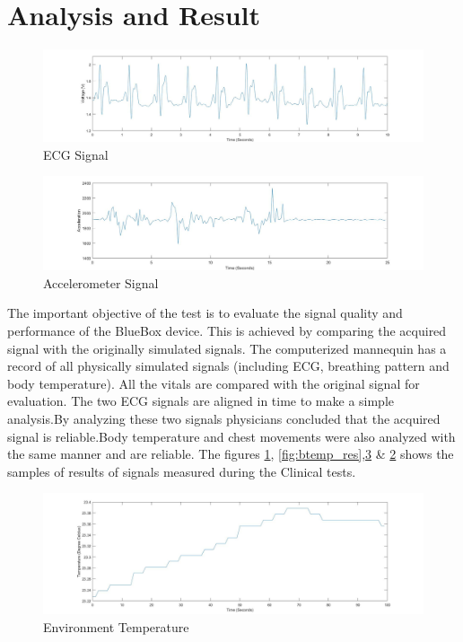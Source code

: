 \section{Analysis and Result}
\begin{figure}
	\centering
	\includegraphics[scale = 0.25 ]{ECG_result.jpg}
	\caption{ECG Signal\label{fig:ecg_res}}
\end{figure}
\begin{figure}[h]
	\centering
	\includegraphics[scale = 0.25 ]{acc_result.jpg}
	\caption{Accelerometer Signal\label{fig:acc_res}}
\end{figure}


The important objective of the test is to evaluate the signal quality and performance of the BlueBox device. This is achieved by comparing the acquired signal with the originally simulated signals. The computerized mannequin has a record of all physically simulated signals (including ECG, breathing pattern and body temperature). All the vitals are compared with the original signal for evaluation. The two ECG signals are aligned in time to make a simple analysis.By analyzing these two signals physicians concluded that the acquired signal is reliable.Body temperature and chest movements were also analyzed with the same manner and are reliable. 
The figures \ref{fig:ecg_res}, \ref{fig:btemp_res},\ref{fig:env_res} \& \ref{fig:acc_res} shows the samples of results of signals measured during the Clinical tests.

\begin{figure}[h]
	\centering
	\includegraphics[scale = 0.20 ]{envT_result.jpg}
	\caption{Environment Temperature\label{fig:env_res}}
\end{figure}



